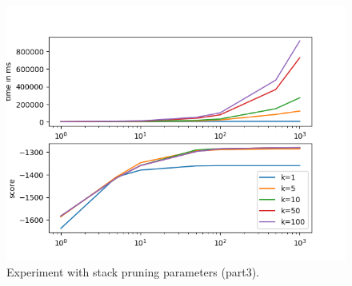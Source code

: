 \documentclass[answers]{exam}
\begin{document}
\begin{figure}
  \centering
  \includegraphics{fig-part3}
  \caption[Experiment (baseline).]{Experiment with stack pruning parameters
    (part3).}
  \label{fig:exp-part3}
\end{figure}
\end{document}
